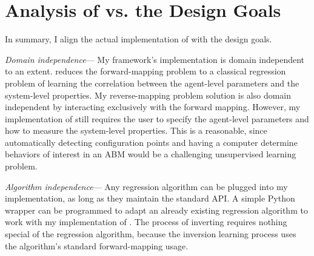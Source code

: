 



\section{Analysis of \fw  vs. the Design Goals}
In summary, I align the actual implementation of \fw with the design goals.



\textit{Domain independence}---
My framework's implementation is domain independent to an extent. \fw reduces the forward-mapping problem to a classical regression problem of learning the correlation between the agent-level parameters and the system-level properties.
My reverse-mapping problem solution is also domain independent by interacting exclusively with the forward mapping.
However, my implementation of \fw still requires the user to specify the agent-level parameters and how to measure the system-level properties.
This is a reasonable, since automatically detecting configuration points and having a computer determine behaviors of interest in an ABM would be a challenging unsupervised learning problem.

\textit{Algorithm independence}---
Any regression algorithm can be plugged into my implementation, as long as they maintain the standard API.
A simple Python wrapper can be programmed to adapt an already existing regression algorithm to work with my implementation of \fw.
The process of inverting requires nothing special of the regression algorithm, because the inversion learning process uses the algorithm's standard forward-mapping usage.


